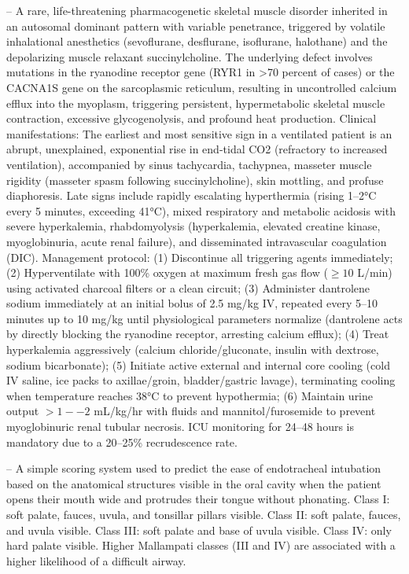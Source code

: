 -- A rare, life-threatening pharmacogenetic skeletal muscle disorder inherited in an autosomal dominant pattern with variable penetrance, triggered by volatile inhalational anesthetics (sevoflurane, desflurane, isoflurane, halothane) and the depolarizing muscle relaxant succinylcholine. The underlying defect involves mutations in the ryanodine receptor gene (RYR1 in >70 percent of cases) or the CACNA1S gene on the sarcoplasmic reticulum, resulting in uncontrolled calcium efflux into the myoplasm, triggering persistent, hypermetabolic skeletal muscle contraction, excessive glycogenolysis, and profound heat production. Clinical manifestations: The earliest and most sensitive sign in a ventilated patient is an abrupt, unexplained, exponential rise in end-tidal CO2 (refractory to increased ventilation), accompanied by sinus tachycardia, tachypnea, masseter muscle rigidity (masseter spasm following succinylcholine), skin mottling, and profuse diaphoresis. Late signs include rapidly escalating hyperthermia (rising 1--2°C every 5 minutes, exceeding 41°C), mixed respiratory and metabolic acidosis with severe hyperkalemia, rhabdomyolysis (hyperkalemia, elevated creatine kinase, myoglobinuria, acute renal failure), and disseminated intravascular coagulation (DIC). Management protocol: (1) Discontinue all triggering agents immediately; (2) Hyperventilate with 100\% oxygen at maximum fresh gas flow ($\ge 10$ L/min) using activated charcoal filters or a clean circuit; (3) Administer dantrolene sodium immediately at an initial bolus of 2.5 mg/kg IV, repeated every 5--10 minutes up to 10 mg/kg until physiological parameters normalize (dantrolene acts by directly blocking the ryanodine receptor, arresting calcium efflux); (4) Treat hyperkalemia aggressively (calcium chloride/gluconate, insulin with dextrose, sodium bicarbonate); (5) Initiate active external and internal core cooling (cold IV saline, ice packs to axillae/groin, bladder/gastric lavage), terminating cooling when temperature reaches 38°C to prevent hypothermia; (6) Maintain urine output $>1--2$ mL/kg/hr with fluids and mannitol/furosemide to prevent myoglobinuric renal tubular necrosis. ICU monitoring for 24--48 hours is mandatory due to a 20--25\% recrudescence rate.

-- A simple scoring system used to predict the ease of endotracheal intubation based on the anatomical structures visible in the oral cavity when the patient opens their mouth wide and protrudes their tongue without phonating. Class I: soft palate, fauces, uvula, and tonsillar pillars visible. Class II: soft palate, fauces, and uvula visible. Class III: soft palate and base of uvula visible. Class IV: only hard palate visible. Higher Mallampati classes (III and IV) are associated with a higher likelihood of a difficult airway.

